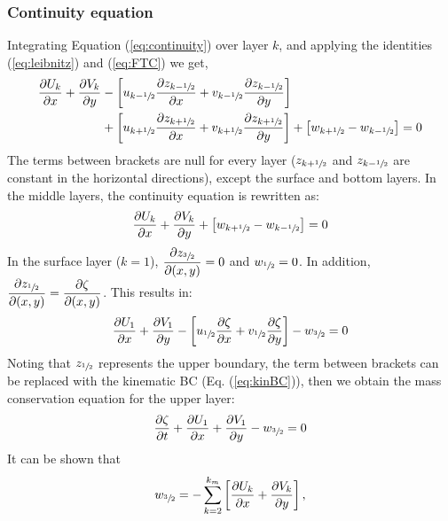 \subsubsection{Continuity equation}
Integrating Equation (\ref{eq:continuity}) over layer $k$, and applying the identities (\ref{eq:leibnitz}) and (\ref{eq:FTC}) we get,
\begin{equation}
    \begin{split}
        \frac{\partial U_k}{\partial x} +  \frac{\partial V_k}{\partial y} &- \left[u_{k-\sfrac{1}{2}} \frac{\partial z_{k-\sfrac{1}{2}}}{\partial x}+v_{k-\sfrac{1}{2}}\frac{\partial z_{k-\sfrac{1}{2}}}{\partial y}\right] \\
        &+ \left[u_{k+\sfrac{1}{2}} \frac{\partial z_{k+\sfrac{1}{2}}}{\partial x}+v_{k+\sfrac{1}{2}}\frac{\partial z_{k+\sfrac{1}{2}}}{\partial y}\right]  + \left[ w_{k+\sfrac{1}{2}} - w_{k-\sfrac{1}{2}} \right] = 0
    \end{split}
\end{equation}
The terms between brackets are null for every layer ($z_{k+\sfrac{1}{2}}$ and $z_{k-\sfrac{1}{2}}$ are constant in the horizontal directions), except the surface and bottom layers. In the middle layers, the continuity equation is rewritten as:
\begin{equation}
    \frac{\partial U_k}{\partial x} +  \frac{\partial V_k}{\partial y} + \left[ w_{k+\sfrac{1}{2}} - w_{k-\sfrac{1}{2}} \right] = 0
\end{equation}
In the surface layer ($k=1$), $\dfrac{\partial z_{\sfrac{3}{2}}}{\partial (x,y)}  = 0$ and $w_{\sfrac{1}{2}}=0$. In addition,  $\dfrac{\partial z_{\sfrac{1}{2}}}{\partial (x,y)}  = \dfrac{\partial \zeta}{\partial (x,y)}$. This results in:
\begin{equation}
    \frac{\partial U_1}{\partial x} +  \frac{\partial V_1}{\partial y} - \left[u_{\sfrac{1}{2}} \frac{\partial \zeta}{\partial x}+v_{\sfrac{1}{2}}\frac{\partial \zeta}{\partial y}\right]   -  w_{\sfrac{3}{2}}  = 0
\end{equation}
Noting that $z_{\sfrac{1}{2}}$ represents the upper boundary, the term between brackets can be replaced with the kinematic BC (Eq. (\ref{eq:kinBC})), then we obtain the mass conservation equation for the upper layer:
\begin{equation}
    \frac{\partial \zeta}{\partial t}+\frac{\partial U_1}{\partial x} +  \frac{\partial V_1}{\partial y} -  w_{\sfrac{3}{2}}  = 0
    \label{eq:cont02}
\end{equation}
It can be shown that
\begin{equation}
    w_{\sfrac{3}{2}} = -\sum_{k=2}^{k_m} \left[\frac{\partial U_k}{\partial x}+\frac{\partial V_k}{\partial y}\right],
\end{equation}
